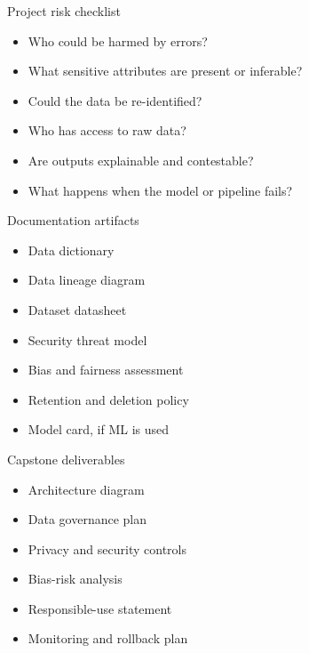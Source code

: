\documentclass[aspectratio=43,12pt]{beamer}
\begin{document}
\begin{frame}{Project risk checklist}
\begin{itemize}
  \item Who could be harmed by errors?
  \item What sensitive attributes are present or inferable?
  \item Could the data be re-identified?
  \item Who has access to raw data?
  \item Are outputs explainable and contestable?
  \item What happens when the model or pipeline fails?
\end{itemize}
\end{frame}

\begin{frame}{Documentation artifacts}
\begin{itemize}
  \item Data dictionary
  \item Data lineage diagram
  \item Dataset datasheet
  \item Security threat model
  \item Bias and fairness assessment
  \item Retention and deletion policy
  \item Model card, if ML is used
\end{itemize}
\end{frame}

\begin{frame}{Capstone deliverables}
\begin{itemize}
  \item Architecture diagram
  \item Data governance plan
  \item Privacy and security controls
  \item Bias-risk analysis
  \item Responsible-use statement
  \item Monitoring and rollback plan
\end{itemize}
\end{frame}
\end{document}
